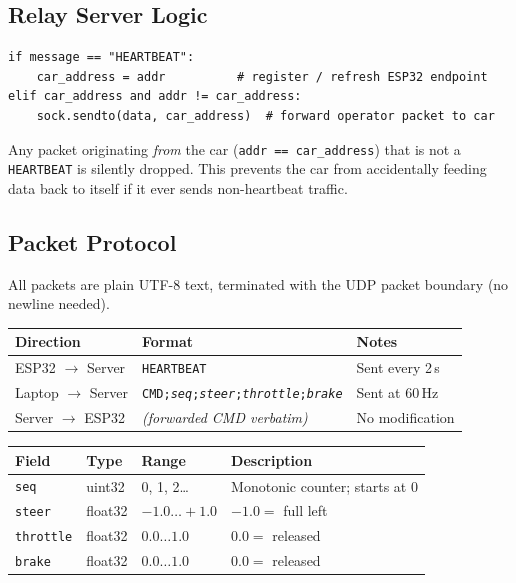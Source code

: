 \documentclass[12pt, letterpaper]{article}
\begin{document}
\subsection{Relay Server Logic}

\begin{lstlisting}[style=python]
if message == "HEARTBEAT":
    car_address = addr          # register / refresh ESP32 endpoint
elif car_address and addr != car_address:
    sock.sendto(data, car_address)  # forward operator packet to car
\end{lstlisting}

Any packet originating \emph{from} the car (\texttt{addr == car\_address}) that
is not a \texttt{HEARTBEAT} is silently dropped.  This prevents the car from
accidentally feeding data back to itself if it ever sends non-heartbeat traffic.

\subsection{Packet Protocol}

All packets are plain UTF-8 text, terminated with the UDP packet boundary
(no newline needed).

\begin{center}
\begin{tabular}{lll}
  \toprule
  \textbf{Direction} & \textbf{Format} & \textbf{Notes} \\
  \midrule
  ESP32 $\to$ Server & \texttt{HEARTBEAT} & Sent every 2\,s \\
  Laptop $\to$ Server & \texttt{CMD;\textit{seq};\textit{steer};\textit{throttle};\textit{brake}}
    & Sent at 60\,Hz \\
  Server $\to$ ESP32 & \textit{(forwarded CMD verbatim)} & No modification \\
  \bottomrule
\end{tabular}
\end{center}

\begin{center}
\begin{tabular}{llll}
  \toprule
  \textbf{Field} & \textbf{Type} & \textbf{Range} & \textbf{Description} \\
  \midrule
  \texttt{seq}      & uint32  & 0, 1, 2\ldots & Monotonic counter; starts at 0 \\
  \texttt{steer}    & float32 & $-1.0\ldots+1.0$ & $-1.0=$ full left \\
  \texttt{throttle} & float32 & $0.0\ldots1.0$   & $0.0=$ released \\
  \texttt{brake}    & float32 & $0.0\ldots1.0$   & $0.0=$ released \\
  \bottomrule
\end{tabular}
\end{center}
\end{document}
